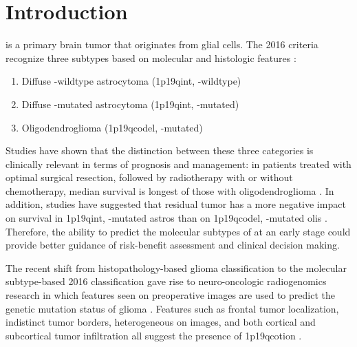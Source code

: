 \section{Introduction}

 is a primary brain \gls{tumor} that originates from glial cells.
The  2016 criteria recognize three subtypes based on molecular and histologic features \autocite{louis20162016,van2017diffuse}:

\begin{enumerate}
\item Diffuse -wildtype astrocytoma (\acl{1p19qint}, -wildtype)
\item Diffuse -mutated astrocytoma (\acl{1p19qint}, -mutated)
\item Oligodendroglioma (\acl{1p19qcodel}, -mutated)
\end{enumerate}

Studies have shown that the distinction between these three categories is clinically relevant in terms of prognosis and management: in patients treated with optimal surgical resection, followed by radiotherapy with or without chemotherapy, median survival is longest of those with oligodendroglioma \autocite{cairncross2014benefit, dubbink2015molecular}.
In addition, studies have suggested that residual \gls{tumor} has a more negative impact on survival in \acl{1p19qint}, -mutated \glspl{astro} than on \acl{1p19qcodel}, -mutated \glspl{oli} \autocite{wijnenga2017impact, clark2019extent}.
Therefore, the ability to predict the molecular subtypes of  at an early stage could provide better guidance of risk-benefit assessment and clinical decision making.

The recent shift from histopathology-based glioma classification to the molecular subtype-based  2016 classification gave rise to neuro-oncologic radiogenomics research in which features seen on preoperative  images are used to predict the genetic mutation status of glioma \autocite{smits2017imaging, gevaert2014glioblastoma, gutman2013mr}.
Features such as frontal \gls{tumor} localization, indistinct \gls{tumor} borders, heterogeneous  on  images, and both cortical and subcortical \gls{tumor} infiltration all suggest the presence of \acl{1p19qcotion} \autocite{smits2017imaging}.

